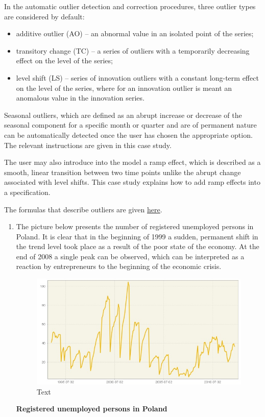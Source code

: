 \documentclass[
  letterpaper,
  DIV=11,
  numbers=noendperiod]{scrreprt}
\begin{document}
In the automatic outlier detection and correction procedures, three
outlier types are considered by default:

\begin{itemize}
\item
  additive outlier (AO) -- an abnormal value in an isolated point of the
  series;
\item
  transitory change (TC) -- a series of outliers with a temporarily
  decreasing effect on the level of the series;
\item
  level shift (LS) -- series of innovation outliers with a constant
  long-term effect on the level of the series, where for an innovation
  outlier is meant an anomalous value in the innovation series.
\end{itemize}

Seasonal outliers, which are defined as an abrupt increase or decrease
of the seasonal component for a specific month or quarter and are of
permanent nature can be automatically detected once the user has chosen
the appropriate option. The relevant instructions are given in this case
study.

The user may also introduce into the model a ramp effect, which is
described as a smooth, linear transition between two time points unlike
the abrupt change associated with level shifts. This case study explains
how to add ramp effects into a specification.

The formulas that describe outliers are given
\href{../theory/SA_lin.html}{here}.

\begin{enumerate}
\def\labelenumi{\arabic{enumi}.}
\item
  The picture below presents the number of registered unemployed persons
  in Poland. It is clear that in the beginning of 1999 a sudden,
  permanent shift in the trend level took place as a result of the poor
  state of the economy. At the end of 2008 a single peak can be
  observed, which can be interpreted as a reaction by entrepreneurs to
  the beginning of the economic crisis.

  \begin{figure}

  {\centering \includegraphics{./All_images/UG_SA_image13.jpg}

  }

  \caption{Text}

  \end{figure}

  \textbf{Registered unemployed persons in Poland}
\end{enumerate}
\end{document}
